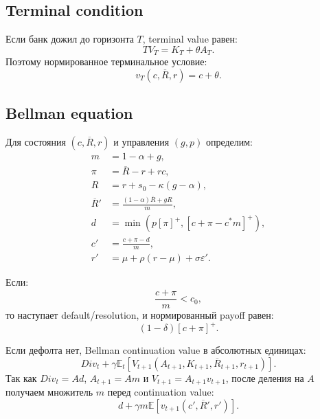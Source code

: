 \documentclass[11pt,a4paper]{article}
\newcommand{\1}{\mathbf{1}}
\newcommand{\E}{\mathbb{E}}
\newcommand{\pos}[1]{\left[#1\right]^+}
\begin{document}
\subsection{Terminal condition}

Если банк дожил до горизонта $T$, terminal value равен:
\begin{equation}
    TV_T=K_T+\theta A_T.
\end{equation}
Поэтому нормированное терминальное условие:
\begin{equation}
    \boxed{
    v_T(c,\overline{R},r)=c+\theta.
    }
\end{equation}

\subsection{Bellman equation}

Для состояния $(c,\overline{R},r)$ и управления $(g,p)$ определим:
\begin{align}
    m &= 1-\alpha+g,\\
    \pi &= \overline{R}-r+rc,\\
    R &= r+s_0-\kappa(g-\alpha),\\
    \overline{R}' &= \frac{(1-\alpha)\overline{R}+gR}{m},\\
    d &= \min\left(p\pos{\pi},\pos{c+\pi-c^*m}\right),\\
    c' &= \frac{c+\pi-d}{m},\\
    r' &= \mu+\rho(r-\mu)+\sigma\varepsilon'.
\end{align}

Если:
\begin{equation}
    \frac{c+\pi}{m}<c_0,
\end{equation}
то наступает default/resolution, и нормированный payoff равен:
\begin{equation}
    (1-\delta)\pos{c+\pi}.
\end{equation}

Если дефолта нет, Bellman continuation value в абсолютных единицах:
\begin{equation}
    Div_t+\gamma\E_t[V_{t+1}(A_{t+1},K_{t+1},\overline{R}_{t+1},r_{t+1})].
\end{equation}
Так как $Div_t=Ad$, $A_{t+1}=Am$ и $V_{t+1}=A_{t+1}v_{t+1}$, после деления на $A$ получаем множитель $m$ перед continuation value:
\begin{equation}
    d+\gamma m\E\left[v_{t+1}(c',\overline{R}',r')\right].
\end{equation}
\end{document}
